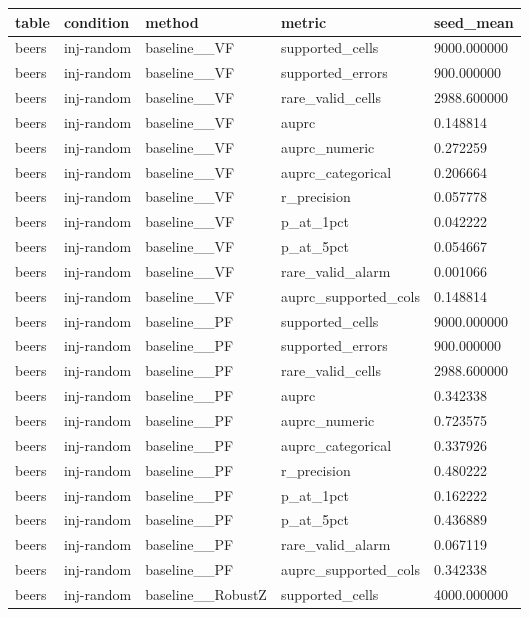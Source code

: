 \begin{tabular}{lllll}
\hline
table & condition & method & metric & seed\_mean \\
\hline
beers & inj-random & baseline\_\_VF & supported\_cells & 9000.000000 \\
beers & inj-random & baseline\_\_VF & supported\_errors & 900.000000 \\
beers & inj-random & baseline\_\_VF & rare\_valid\_cells & 2988.600000 \\
beers & inj-random & baseline\_\_VF & auprc & 0.148814 \\
beers & inj-random & baseline\_\_VF & auprc\_numeric & 0.272259 \\
beers & inj-random & baseline\_\_VF & auprc\_categorical & 0.206664 \\
beers & inj-random & baseline\_\_VF & r\_precision & 0.057778 \\
beers & inj-random & baseline\_\_VF & p\_at\_1pct & 0.042222 \\
beers & inj-random & baseline\_\_VF & p\_at\_5pct & 0.054667 \\
beers & inj-random & baseline\_\_VF & rare\_valid\_alarm & 0.001066 \\
beers & inj-random & baseline\_\_VF & auprc\_supported\_cols & 0.148814 \\
beers & inj-random & baseline\_\_PF & supported\_cells & 9000.000000 \\
beers & inj-random & baseline\_\_PF & supported\_errors & 900.000000 \\
beers & inj-random & baseline\_\_PF & rare\_valid\_cells & 2988.600000 \\
beers & inj-random & baseline\_\_PF & auprc & 0.342338 \\
beers & inj-random & baseline\_\_PF & auprc\_numeric & 0.723575 \\
beers & inj-random & baseline\_\_PF & auprc\_categorical & 0.337926 \\
beers & inj-random & baseline\_\_PF & r\_precision & 0.480222 \\
beers & inj-random & baseline\_\_PF & p\_at\_1pct & 0.162222 \\
beers & inj-random & baseline\_\_PF & p\_at\_5pct & 0.436889 \\
beers & inj-random & baseline\_\_PF & rare\_valid\_alarm & 0.067119 \\
beers & inj-random & baseline\_\_PF & auprc\_supported\_cols & 0.342338 \\
beers & inj-random & baseline\_\_RobustZ & supported\_cells & 4000.000000 \\

\end{tabular}
